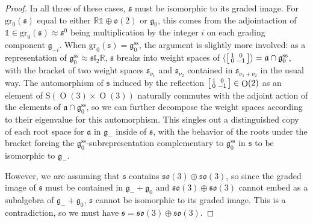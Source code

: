\documentclass[12pt,a4paper]{amsart}
\theoremstyle{definition}
\DeclareMathOperator{\Orth}{O}
\newenvironment{smallbmatrix}
  {\left[\begin{smallmatrix}}
  {\end{smallmatrix}\right]}
\begin{document}
\begin{proof}
In all three of these cases, $\mathfrak{s}$ must be isomorphic to its graded image. For $\mathrm{gr}_0(\mathfrak{s})$ equal to either $\mathbb{R}\mathds{1}\oplus\mathfrak{o}(2)$ or $\mathfrak{g}_0$, this comes from the adjoint\linebreak action of $\mathds{1}\in\mathrm{gr}_0(\mathfrak{s})\approx\mathfrak{s}^0$ being multiplication by the integer $i$ on each grading component $\mathfrak{g}_{-i}$. When $\mathrm{gr}_0(\mathfrak{s})=\mathfrak{g}_0^\text{ss}$, the argument is slightly more involved: as a representation of $\mathfrak{g}_0^\text{ss}\approx\mathfrak{sl}_2\mathbb{R}$, $\mathfrak{s}$ breaks into weight spaces of $\langle\begin{smallbmatrix}1 & 0 \\ 0 & -1\end{smallbmatrix}\rangle=\mathfrak{a}\cap\mathfrak{g}_0^\text{ss}$, with the bracket of two weight spaces $\mathfrak{s}_{\nu_1}$ and $\mathfrak{s}_{\nu_2}$ contained in $\mathfrak{s}_{\nu_1+\nu_2}$ in the usual way. The automorphism of $\mathfrak{s}$ induced by the reflection $\begin{smallbmatrix}1 & 0 \\ 0 & -1\end{smallbmatrix}\in\Orth(2)$ as an element of $\mathrm{S}(\Orth(3)\times\Orth(3))$ naturally commutes with the adjoint action of the elements of $\mathfrak{a}\cap\mathfrak{g}_0^\text{ss}$, so we can further decompose the weight spaces according to their eigenvalue for this automorphism. This singles out a distinguished copy of each root space for $\mathfrak{a}$ in $\mathfrak{g}_-$ inside of $\mathfrak{s}$, with the behavior of the roots under the bracket forcing the $\mathfrak{g}_0^\text{ss}$-subrepresentation complementary to $\mathfrak{g}_0^\text{ss}$ in $\mathfrak{s}$ to be isomorphic to $\mathfrak{g}_-$.

However, we are assuming that $\mathfrak{s}$ contains $\mathfrak{so}(3)\oplus\mathfrak{so}(3)$, so since the graded image of $\mathfrak{s}$ must be contained in $\mathfrak{g}_-+\mathfrak{g}_0$ and $\mathfrak{so}(3)\oplus\mathfrak{so}(3)$ cannot embed as a subalgebra of $\mathfrak{g}_-+\mathfrak{g}_0$, $\mathfrak{s}$ cannot be isomorphic to its graded image. This is a contradiction, so we must have $\mathfrak{s}=\mathfrak{so}(3)\oplus\mathfrak{so}(3)$.\mbox{\qedhere}\end{proof}



\end{document}
